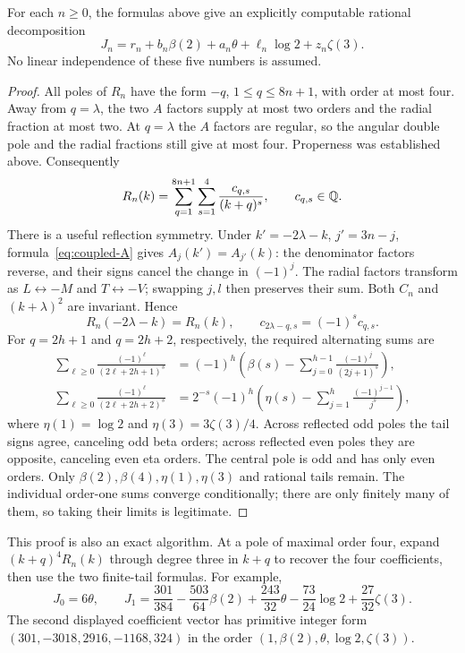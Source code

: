 \begin{proposition}\label{prop:five-period}
For each $n\geq0$, the formulas above give an explicitly computable
rational decomposition
\begin{equation}\label{eq:five-period}
 J_n=r_n+b_n\beta(2)+a_n\theta+\ell_n\log2+z_n\zeta(3).
\end{equation}
No linear independence of these five numbers is assumed.
\end{proposition}
\begin{proof}
All poles of $R_n$ have the form $-q$, $1\leq q\leq8n+1$, with
order at most four. Away from $q=\lambda$, the two $A$ factors
supply at most two orders and the radial fraction at most two.
At $q=\lambda$ the $A$ factors are regular, so the angular double
pole and the radial fractions still give at most four. Properness
was established above. Consequently
\[
 R_n(k)=\sum_{q=1}^{8n+1}\sum_{s=1}^4\frac{c_{q,s}}{(k+q)^s},
 \qquad c_{q,s}\in\mathbb Q.
\]
There is a useful reflection symmetry. Under
$k'=-2\lambda-k$, $j'=3n-j$, formula~\eqref{eq:coupled-A} gives
$A_j(k')=A_{j'}(k)$: the denominator factors reverse, and their signs
cancel the change in $(-1)^j$. The radial factors transform as
$L\leftrightarrow-M$ and $T\leftrightarrow-V$; swapping $j,l$
then preserves their sum. Both $C_n$ and $(k+\lambda)^2$ are
invariant. Hence
\[
 R_n(-2\lambda-k)=R_n(k),\qquad
 c_{2\lambda-q,s}=(-1)^s c_{q,s}.
\]
For $q=2h+1$ and $q=2h+2$, respectively, the required alternating
sums are
\begin{align*}
 \sum_{\ell\geq0}\frac{(-1)^\ell}{(2\ell+2h+1)^s}
 &=(-1)^h\left(\beta(s)-\sum_{j=0}^{h-1}
                          \frac{(-1)^j}{(2j+1)^s}\right),\\
 \sum_{\ell\geq0}\frac{(-1)^\ell}{(2\ell+2h+2)^s}
 &=2^{-s}(-1)^h\left(\eta(s)-\sum_{j=1}^{h}
                          \frac{(-1)^{j-1}}{j^s}\right),
\end{align*}
where $\eta(1)=\log2$ and $\eta(3)=3\zeta(3)/4$.
Across reflected odd poles the tail signs agree, canceling odd beta
orders; across reflected even poles they are opposite, canceling even
eta orders. The central pole is odd and has only even orders.
Only $\beta(2),\beta(4),\eta(1),\eta(3)$ and rational tails remain.
The individual order-one sums converge conditionally; there are only
finitely many of them, so taking their limits is legitimate.
\end{proof}
This proof is also an exact algorithm. At a pole of maximal order four,
expand $(k+q)^4R_n(k)$ through degree three in $k+q$ to recover the
four coefficients, then use the two finite-tail formulas. For example,
\[
 J_0=6\theta,\qquad
 J_1=\frac{301}{384}-\frac{503}{64}\beta(2)
        +\frac{243}{32}\theta-\frac{73}{24}\log2+\frac{27}{32}\zeta(3).
\]
The second displayed coefficient vector has primitive integer form
$(301,-3018,2916,-1168,324)$ in the order
$(1,\beta(2),\theta,\log2,\zeta(3))$.


